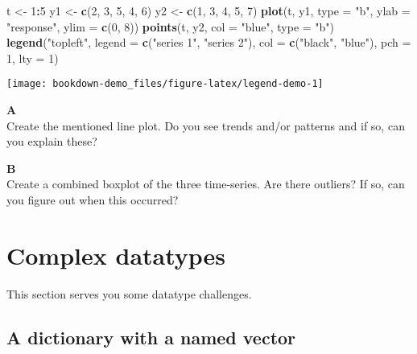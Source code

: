 \documentclass[]{book}
\newenvironment{Shaded}{\begin{snugshade}}{\end{snugshade}}
\newcommand{\DataTypeTok}[1]{\textcolor[rgb]{0.13,0.29,0.53}{#1}}
\newcommand{\DecValTok}[1]{\textcolor[rgb]{0.00,0.00,0.81}{#1}}
\newcommand{\KeywordTok}[1]{\textcolor[rgb]{0.13,0.29,0.53}{\textbf{#1}}}
\newcommand{\NormalTok}[1]{#1}
\newcommand{\OperatorTok}[1]{\textcolor[rgb]{0.81,0.36,0.00}{\textbf{#1}}}
\newcommand{\StringTok}[1]{\textcolor[rgb]{0.31,0.60,0.02}{#1}}
\begin{document}
\begin{Shaded}
\begin{Highlighting}[]
\NormalTok{t <-}\StringTok{ }\DecValTok{1}\OperatorTok{:}\DecValTok{5}
\NormalTok{y1 <-}\StringTok{ }\KeywordTok{c}\NormalTok{(}\DecValTok{2}\NormalTok{, }\DecValTok{3}\NormalTok{, }\DecValTok{5}\NormalTok{, }\DecValTok{4}\NormalTok{, }\DecValTok{6}\NormalTok{)}
\NormalTok{y2 <-}\StringTok{ }\KeywordTok{c}\NormalTok{(}\DecValTok{1}\NormalTok{, }\DecValTok{3}\NormalTok{, }\DecValTok{4}\NormalTok{, }\DecValTok{5}\NormalTok{, }\DecValTok{7}\NormalTok{)}
\KeywordTok{plot}\NormalTok{(t, y1, }\DataTypeTok{type =} \StringTok{"b"}\NormalTok{, }\DataTypeTok{ylab =} \StringTok{"response"}\NormalTok{, }\DataTypeTok{ylim =} \KeywordTok{c}\NormalTok{(}\DecValTok{0}\NormalTok{, }\DecValTok{8}\NormalTok{))}
\KeywordTok{points}\NormalTok{(t, y2, }\DataTypeTok{col =} \StringTok{"blue"}\NormalTok{, }\DataTypeTok{type =} \StringTok{"b"}\NormalTok{)}
\KeywordTok{legend}\NormalTok{(}\StringTok{"topleft"}\NormalTok{, }\DataTypeTok{legend =} \KeywordTok{c}\NormalTok{(}\StringTok{"series 1"}\NormalTok{, }\StringTok{"series 2"}\NormalTok{), }\DataTypeTok{col =} \KeywordTok{c}\NormalTok{(}\StringTok{"black"}\NormalTok{, }\StringTok{"blue"}\NormalTok{), }\DataTypeTok{pch =} \DecValTok{1}\NormalTok{, }\DataTypeTok{lty =} \DecValTok{1}\NormalTok{)}
\end{Highlighting}
\end{Shaded}

\begin{center}\texttt{[image: bookdown-demo\_files/figure-latex/legend-demo-1]} \end{center}

\textbf{A}\\
Create the mentioned line plot. Do you see trends and/or patterns and if so, can you explain these?

\textbf{B}\\
Create a combined boxplot of the three time-series. Are there outliers? If so, can you figure out when this occurred?

\hypertarget{complex-datatypes-1}{%
\section{Complex datatypes}\label{complex-datatypes-1}}

This section serves you some datatype challenges.

\hypertarget{a-dictionary-with-a-named-vector}{%
\subsection{A dictionary with a named vector}\label{a-dictionary-with-a-named-vector}}
\end{document}
